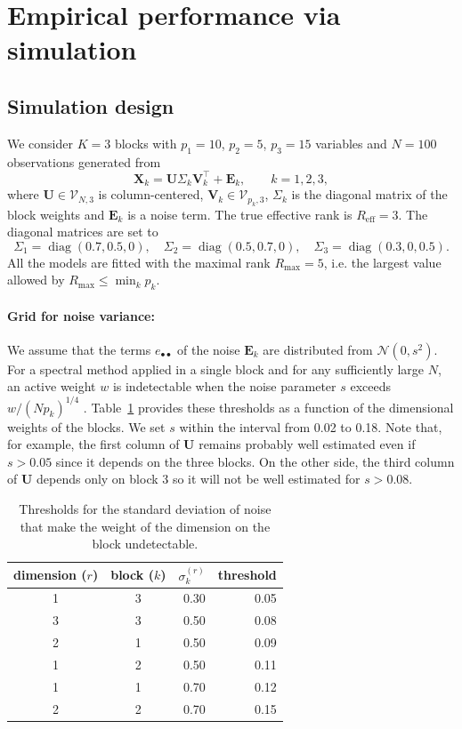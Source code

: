 \documentclass[11pt]{article}
\DeclareMathOperator{\diag}{diag}
\newcommand{\X}{\mathbf{X}}
\newcommand{\U}{\mathbf{U}}
\newcommand{\V}{\mathbf{V}}
\newcommand{\EE}{\mathbf{E}}
\newcommand{\Stiefel}[2]{\mathcal V_{#1,#2}}
\begin{document}
\section{Empirical performance via simulation}

\subsection{Simulation design}
We consider $K=3$ blocks with $p_1=10$, $p_2=5$, $p_3=15$ variables and $N=100$ observations generated from
\[
  \X_k=\U\Sigma_k\V_k^\intercal+\EE_k,\qquad k=1,2,3,
\]
where $\U\in\Stiefel{N}{3}$ is column-centered, $\V_k\in\Stiefel{p_k}{3}$, $\Sigma_k$ is the diagonal matrix of the block weights and $\EE_k$ is a noise term. The true effective rank is $R_{\mathrm{eff}}=3$. The diagonal matrices are set to 
\[\Sigma_1=\diag(0.7,0.5,0), \quad \Sigma_2=\diag(0.5,0.7,0), \quad \Sigma_3=\diag(0.3,0,0.5).\] 
All the models are fitted with the maximal rank $R_{\max}=5$, i.e. the largest value allowed by $R_{\max}\leq\min_kp_k$. 
\paragraph{Grid for noise variance:} We assume that the terms $e_{\bullet\bullet}$ of the noise $\EE_k$ are distributed from $\mathcal{N}(0,s^2)$. For a spectral method applied in a single block and for any sufficiently large $N$, an active weight $w$ is indetectable when the noise parameter $s$ exceeds $w/(Np_k)^{1/4}$ \cite[see][for details]{benaychgeorges2012}. Table~\ref{tab:thres} provides these thresholds as a function of the dimensional weights of the blocks. We set $s$ within the interval from 0.02 to 0.18. Note that, for example, the first column of $\U$ remains probably well estimated even if $s>0.05$ since it depends on the three blocks. On the other side, the third column of $\U$ depends only on block 3 so it will not be well estimated for $s>0.08$.    

\begin{table}[ht]
\centering
\begin{tabular}{ccrr}
  \hline
dimension ($r$) & block ($k$) & $\sigma_k^{(r)}$ & threshold \\ 
  \hline
1 & 3 & 0.30 & 0.05 \\ 
  3 & 3 & 0.50 & 0.08 \\ 
  2 & 1 & 0.50 & 0.09 \\ 
  1 & 2 & 0.50 & 0.11 \\ 
  1 & 1 & 0.70 & 0.12 \\ 
  2 & 2 & 0.70 & 0.15 \\ 
   \hline
\end{tabular}
\caption{Thresholds for the standard deviation of noise that make the weight of the dimension on the block undetectable.\label{tab:thres}}
\end{table}
\end{document}
